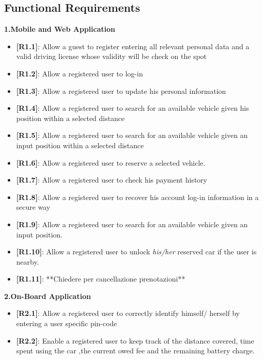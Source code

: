 \documentclass[12pt]{article}
\begin{document}
	  \subsection{Functional Requirements}
	  \textbf{1.Mobile and Web Application}
	  \begin{itemize}
	 		\item{\textbf{[R1.1]}}: Allow a guest to register entering all relevant personal 
	 			 data and a valid driving license whose validity will be check on the spot
	 		\item{\textbf{[R1.2]}}: Allow a registered user to log-in
	 		\item{\textbf{[R1.3]}}: Allow a registered user to update his personal information
	 		\item{\textbf{[R1.4]}}: Allow a registered user to search for an available vehicle 
	 			 given his position within a selected distance
	 		\item{\textbf{[R1.5]}}: Allow a registered user to search for an available vehicle 	
	 			 given an input position within a selected distance
	  		\item{\textbf{[R1.6]}}: Allow a registered user to reserve a selected vehicle.
	 		\item{\textbf{[R1.7]}}: Allow a registered user to check his payment history
	 		\item{\textbf{[R1.8]}}: Allow a registered user to recover his account log-in 	
	 			 information in a secure way
	 		\item{\textbf{[R1.9]}}: Allow a registered user to search for an available vehicle 	
	 			 given an input position.
	 		\item{\textbf{[R1.10]}}: Allow a registered user to unlock \emph{his/her} reserved 	
	 			 car if the user is nearby.
	 		\item{\textbf{[R1.11]}}: **Chiedere per cancellazione prenotazioni**
	 	\end{itemize}

		\textbf{2.On-Board Application}
		\begin{itemize}
	 		\item{\textbf{[R2.1]}}: Allow a registered user to correctly identify himself/
	 			 herself 	by entering a user specific pin-code
 	 		\item{\textbf{[R2.2]}}: Enable a registered user to keep track of the distance 
 	 			 covered, time spent using the car ,the current owed fee and the remaining 	
 	 			 battery charge.
 	 	\end{itemize}
 	 
\end{document}
